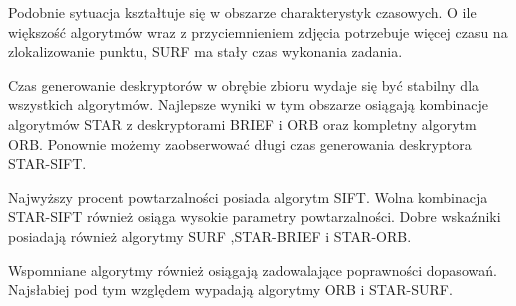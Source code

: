 Podobnie sytuacja kształtuje się w obszarze charakterystyk czasowych. O ile większość algorytmów wraz z przyciemnieniem zdjęcia potrzebuje więcej czasu na zlokalizowanie punktu, SURF ma stały czas wykonania zadania.

Czas generowanie deskryptorów w obrębie zbioru wydaje się być stabilny dla wszystkich algorytmów. Najlepsze wyniki w tym obszarze osiągają kombinacje algorytmów STAR z deskryptorami BRIEF i ORB oraz kompletny algorytm ORB. Ponownie możemy zaobserwować długi czas generowania deskryptora STAR-SIFT.

Najwyższy procent powtarzalności posiada algorytm SIFT. Wolna kombinacja STAR-SIFT również osiąga wysokie parametry powtarzalności. Dobre wskaźniki posiadają również algorytmy SURF ,STAR-BRIEF i STAR-ORB.

Wspomniane algorytmy również osiągają zadowalające poprawności dopasowań. Najsłabiej pod tym względem wypadają algorytmy ORB i STAR-SURF.




\FloatBarrier